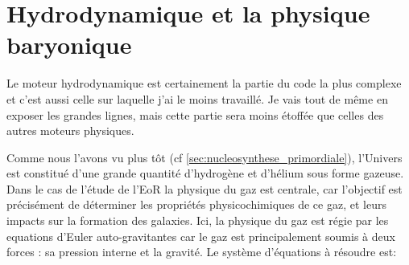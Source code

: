 %
%


%




\clearpage
\section{Hydrodynamique et la physique baryonique}
\label{sec:hydro}

Le moteur hydrodynamique est certainement la partie du code la plus complexe et c'est aussi celle sur laquelle j'ai le moins travaillé.
Je vais tout de même en exposer les grandes lignes, mais cette partie sera moins étoffée que celles des autres moteurs physiques.

Comme nous l'avons vu plus tôt (cf \ref{sec:nucleosynthese_primordiale}), l'Univers est constitué d'une grande quantité d'hydrogène et d'hélium sous forme gazeuse.
Dans le cas de l'étude de l'\ac{EoR} la physique du gaz est centrale, car l'objectif est précisément de déterminer les propriétés physicochimiques de ce gaz, et leurs impacts sur la formation des galaxies.
Ici, la physique du gaz est régie par les equations d'Euler auto-gravitantes car le gaz est principalement soumis à deux forces : sa pression interne et la gravité.
Le système d'équations à résoudre est:

